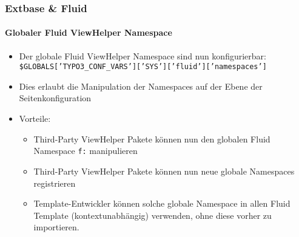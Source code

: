 \begin{frame}[fragile]
	\frametitle{Extbase \& Fluid}
	\framesubtitle{Globaler Fluid ViewHelper Namespace}

	\begin{itemize}
		\item Der globale Fluid ViewHelper Namespace sind nun konfigurierbar:\newline
			\smaller
				\texttt{\$GLOBALS['TYPO3\_CONF\_VARS']['SYS']['fluid']['namespaces']}
			\normalsize
		\item Dies erlaubt die Manipulation der Namespaces auf der Ebene der Seitenkonfiguration
		\item Vorteile:

			\begin{itemize}
				\item Third-Party ViewHelper Pakete können nun den globalen Fluid Namespace \texttt{f:} manipulieren
				\item Third-Party ViewHelper Pakete können nun neue globale Namespaces registrieren
				\item Template-Entwickler können solche globale Namespace in allen Fluid Template (kontextunabhängig) verwenden, ohne diese vorher zu importieren.
			\end{itemize}

	\end{itemize}

\end{frame}


